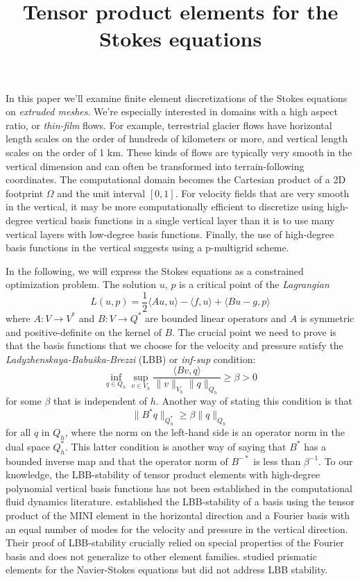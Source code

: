 \documentclass{article}
\title{Tensor product elements for the Stokes equations}
\author{}
\date{}
\theoremstyle{definition}
\theoremstyle{plain}
\begin{document}
\maketitle

In this paper we'll examine finite element discretizations of the Stokes equations on \emph{extruded meshes}.
We're especially interested in domains with a high aspect ratio, or \emph{thin-film} flows.
For example, terrestrial glacier flows have horizontal length scales on the order of hundreds of kilometers or more, and vertical length scales on the order of 1 km.
These kinds of flows are typically very smooth in the vertical dimension and can often be transformed into terrain-following coordinates.
The computational domain becomes the Cartesian product of a 2D footprint $\Omega$ and the unit interval $[0, 1]$.
For velocity fields that are very smooth in the vertical, it may be more computationally efficient to discretize using high-degree vertical basis functions in a single vertical layer than it is to use many vertical layers with low-degree basis functions.
Finally, the use of high-degree basis functions in the vertical suggests using a p-multigrid scheme.

In the following, we will express the Stokes equations as a constrained optimization problem.
The solution $u$, $p$ is a critical point of the \emph{Lagrangian}
\begin{equation}
    L(u, p) = \frac{1}{2}\langle Au, u\rangle - \langle f, u\rangle + \langle Bu - g, p\rangle
\end{equation}
where $A : V \to V^*$ and $B : V \to Q^*$ are bounded linear operators and $A$ is symmetric and positive-definite on the kernel of $B$.
The crucial point we need to prove is that the basis functions that we choose for the velocity and pressure satisfy the \emph{Ladyzhenskaya-Babu\v{s}ka-Brezzi} (LBB) or \emph{inf-sup} condition:
\begin{equation}
    \inf_{q\in Q_h}\sup_{v \in V_h}\frac{\langle Bv, q\rangle}{\|v\|_{V_h}\|q\|_{Q_h}} \ge \beta > 0
\end{equation}
for some $\beta$ that is independent of $h$.
Another way of stating this condition is that
\begin{equation}
    \|B^*q\|_{Q_h^*} \ge \beta\|q\|_{Q_h}
\end{equation}
for all $q$ in $Q_h$, where the norm on the left-hand side is an operator norm in the dual space $Q_h^*$.
This latter condition is another way of saying that $B^*$ has a bounded inverse map and that the operator norm of $B^{-*}$ is less than $\beta^{-1}$.
To our knowledge, the LBB-stability of tensor product elements with high-degree polynomial vertical basis functions has not been established in the computational fluid dynamics literature.
\citet{canuto1984combined} established the LBB-stability of a basis using the tensor product of the MINI element in the horizontal direction and a Fourier basis with an equal number of modes for the velocity and pressure in the vertical direction.
Their proof of LBB-stability crucially relied on special properties of the Fourier basis and does not generalize to other element families.
\citet{nakahashi1989finite} studied prismatic elements for the Navier-Stokes equations but did not address LBB stability.
\end{document}
